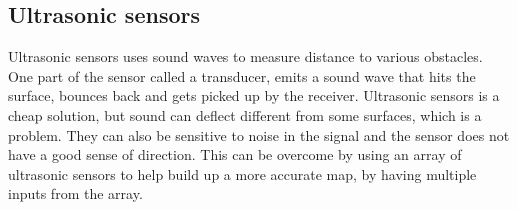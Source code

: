 \subsection{Ultrasonic sensors}
Ultrasonic sensors uses sound waves to measure distance to various obstacles. One part of the sensor called a transducer, emits a sound wave that hits the surface, bounces back and gets picked up by the receiver. 
Ultrasonic sensors is a cheap solution, but sound can deflect different from some surfaces, which is a problem. They can also be sensitive to noise in the signal and the sensor does not have a good sense of direction. This can be overcome by using an array of ultrasonic sensors to help build up a more accurate map, by having multiple inputs from the array\cite{Ultrasonicsnesor}.

